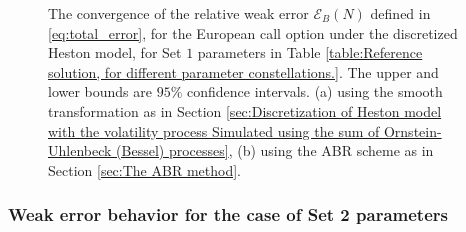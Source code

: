 \begin{figure}[htb]
\begin{subfigure}{0.4\textwidth}
		\caption{}
		\label{fig:2}
	\end{subfigure}\hfil %
	\caption{The convergence of the relative weak error  $\mathcal{E}_B(N)$ defined in \ref{eq:total_error}, for the European call option  under the discretized  Heston model, for Set $1$ parameters in Table \ref{table:Reference solution, for different parameter constellations.}. The upper and lower bounds are $95\%$ confidence intervals. (a) using the smooth transformation as in Section \ref{sec:Discretization of Heston model with the volatility process Simulated using the sum of  Ornstein-Uhlenbeck (Bessel) processes}, (b) using the ABR scheme as in Section \ref{sec:The ABR method}.}
	\label{fig:weak convergence comparison set 1}	
\end{figure}
\FloatBarrier
\subsubsection*{Weak error behavior for the case of Set 2 parameters}


